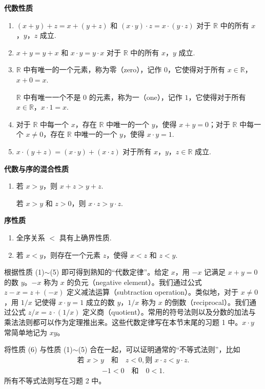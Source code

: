 \documentclass[../../main.tex]{subfiles}
\begin{document}
\textbf{代数性质}
\begin{enumerate}[(1)]
\item $(x + y) + z = x + (y + z)$ 和 $(x \cdot y) \cdot z = x \cdot (y \cdot z)$ 对于 $\mathbb{R}$ 中的所有 $x$，$y$，$z$ 成立.
\item $x + y = y + x$ 和 $x \cdot y = y \cdot x$ 对于 $\mathbb{R}$ 中的所有 $x$，$y$ 成立.
\item $\mathbb{R}$ 中有唯一的一个元素，称为零（zero），记作 $0$，它使得对于所有 $x \in \mathbb{R}$，$x + 0 = x$.

$\mathbb{R}$ 中有唯一一个不是 $0$ 的元素，称为一（one），记作 $1$，它使得对于所有 $x \in \mathbb{R}$，$x \cdot 1 = x$.
\item 对于 $\mathbb{R}$ 中每一个 $x$，存在 $\mathbb{R}$ 中唯一的一个 $y$，使得 $x + y = 0$；对于 $\mathbb{R}$ 中每一个 $x \neq 0$，存在 $\mathbb{R}$ 中唯一的一个 $y$，使得 $x \cdot y = 1$.
\item $x \cdot (y + z) = (x \cdot y) + (x \cdot z)$ 对于所有 $x$，$y$，$z \in \mathbb{R}$ 成立.
\end{enumerate}

\textbf{代数与序的混合性质}
\begin{enumerate}[(6)]
\item 若 $x > y$，则 $x + z > y + z$.

若 $x > y$ 和 $z > 0$，则 $x \cdot z > y \cdot z$.
\end{enumerate}

\textbf{序性质}
\begin{enumerate}[(7)]
\item 全序关系 $<$ 具有上确界性质.
\item 若 $x < y$，则存在一个元素 $z$，使得 $x < z$ 和 $z < y$.
\end{enumerate}

根据性质 (1)$\sim$(5) 即可得到熟知的“代数定律”。给定 $x$，用 $-x$ 记满足 $x + y = 0$ 的数 $y$。$-x$ 称为 $x$ 的负元（negative element）。我们通过公式 $z - x = z + (-x)$ 定义减法运算（subtraction operation）。类似地，对于 $x \neq 0$，用 $1/x$ 记使得 $x \cdot y = 1$ 成立的数 $y$，$1/x$ 称为 $x$ 的倒数（reciprocal）。我们通过公式 $z/x = z \cdot (1/x)$ 定义商（quotient）。常用的符号法则以及分数的加法与乘法法则都可以作为定理推出来。这些代数定律写在本节末尾的习题 1 中。$x \cdot y$ 常简单地记为 $xy$。

将性质 (6) 与性质 (1)$\sim$(5) 合在一起，可以证明通常的“不等式法则”，比如
\begin{align*}
\text{若 } x > y \quad \text{和} \quad z < 0, \text{则 } x \cdot z < y \cdot z.
\end{align*}
\begin{align*}
-1 < 0 \quad \text{和} \quad 0 < 1.
\end{align*}
所有不等式法则写在习题 2 中。
\end{document}
